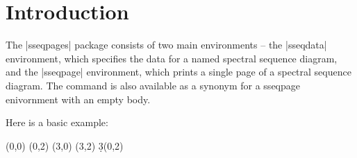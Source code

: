 \documentclass{ltxdoc}
\begin{document}
\section{Introduction}
The |sseqpages| package consists of two main environments -- the |sseqdata| environment, which specifies the data for a named spectral sequence diagram, and the |sseqpage| environment, which prints a single page of a spectral sequence diagram. The command \cmd\printpage{} is also available as a synonym for a sseqpage enivornment with an empty body.

Here is a basic example:
\begin{codeexample}[]
\begin{sseqdata}[name=ex1,cohomological Serre grading]
\class(0,0)
\class(0,2)
\class(3,0)
\class(3,2)
\d3(0,2)
\end{sseqdata}
\printpage[name=ex1,page=3]\hskip1cm
\printpage[name=ex1,page=4]
\end{codeexample}
\end{document}
